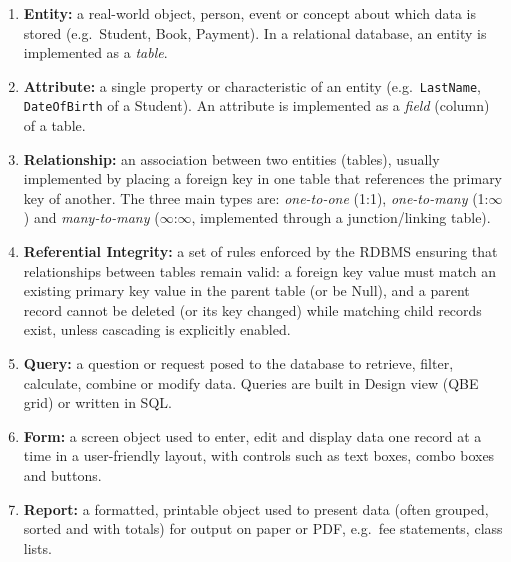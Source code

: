 \documentclass[11pt]{article}
\begin{document}
\begin{corrige}
\begin{enumerate}
\item \textbf{Entity:} a real-world object, person, event or concept about which data is stored (e.g.\ Student, Book, Payment). In a relational database, an entity is implemented as a \emph{table}.
\item \textbf{Attribute:} a single property or characteristic of an entity (e.g.\ \texttt{LastName}, \texttt{DateOfBirth} of a Student). An attribute is implemented as a \emph{field} (column) of a table.
\item \textbf{Relationship:} an association between two entities (tables), usually implemented by placing a foreign key in one table that references the primary key of another. The three main types are: \emph{one-to-one} (1:1), \emph{one-to-many} (1:$\infty$) and \emph{many-to-many} ($\infty$:$\infty$, implemented through a junction/linking table).
\item \textbf{Referential Integrity:} a set of rules enforced by the RDBMS ensuring that relationships between tables remain valid: a foreign key value must match an existing primary key value in the parent table (or be Null), and a parent record cannot be deleted (or its key changed) while matching child records exist, unless cascading is explicitly enabled.
\item \textbf{Query:} a question or request posed to the database to retrieve, filter, calculate, combine or modify data. Queries are built in Design view (QBE grid) or written in SQL.
\item \textbf{Form:} a screen object used to enter, edit and display data one record at a time in a user-friendly layout, with controls such as text boxes, combo boxes and buttons.
\item \textbf{Report:} a formatted, printable object used to present data (often grouped, sorted and with totals) for output on paper or PDF, e.g.\ fee statements, class lists.
\end{enumerate}
\end{corrige}
\end{document}
